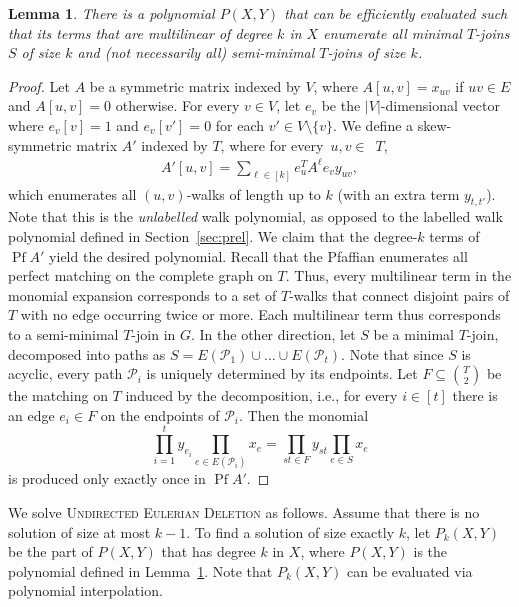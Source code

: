\documentclass[10pt,a4paper]{article}
\newtheorem{lemma}{Lemma}[section]
\newcommand{\cP}{\ensuremath{\mathcal P}\xspace}
\DeclareMathOperator{\Pf}{Pf}
\begin{document}
\begin{lemma} \label{lemma:undirected-eulerian}
  There is a polynomial $P(X,Y)$ that can be efficiently evaluated such that its terms that are multilinear of degree $k$ in $X$  enumerate all minimal $T$-joins $S$ of size $k$ and (not necessarily all) semi-minimal $T$-joins of size $k$. 
\end{lemma}
\begin{proof}
  Let $A$ be a symmetric matrix indexed by $V$, where $A[u, v] = x_{uv}$ if $uv \in E$ and $A[u, v] = 0$ otherwise.
  For every $v \in V$, let $e_v$ be the $|V|$-dimensional vector where $e_v[v] = 1$ and $e_v[v']= 0$ for each $v' \in V \setminus \{ v \}$.
  We define a skew-symmetric matrix $A'$ indexed by $T$, where for every~$u, v \in$~$T$,
  \begin{align*}
    A'[u, v] = \sum_{\ell \in [k]} e_u^T A^{\ell} e_v y_{uv},
  \end{align*}
  which enumerates all $(u,v)$-walks of length up to $k$ (with an extra term $y_{t,t'}$).
  Note that this is the \emph{unlabelled} walk polynomial, as opposed to the labelled walk polynomial defined in Section~\ref{sec:prel}.
  We claim that the degree-$k$ terms of $\Pf A'$ yield the desired polynomial.
  Recall that the Pfaffian enumerates all perfect matching on the complete graph on $T$.
  Thus, every multilinear term in the monomial expansion corresponds to a set of $T$-walks that connect disjoint pairs of $T$ with no edge occurring twice or more.
  Each multilinear term thus corresponds to a semi-minimal $T$-join in $G$.
  In the other direction, let $S$ be a minimal $T$-join, decomposed into paths as $S=E(\cP_1) \cup \ldots \cup E(\cP_t)$.
  Note that since $S$ is acyclic, every path $\cP_i$ is uniquely determined by its endpoints. 
  Let $F \subseteq \binom{T}{2}$ be the matching on $T$ induced by the decomposition,
  i.e., for every $i \in [t]$ there is an edge $e_i \in F$ on the endpoints of $\cP_i$.
  Then the monomial
  \[
    \prod_{i=1}^t y_{e_i} \prod_{e \in E(\cP_i)} x_e = \prod_{st \in F} y_{st} \prod_{e \in S} x_e
  \]
  is produced only exactly once in $\Pf A'$. 
\end{proof}

We solve \textsc{Undirected Eulerian Deletion} as follows.
Assume that there is no solution of size at most $k - 1$.
To find a solution of size exactly $k$, let $P_k(X,Y)$ be the part of $P(X,Y)$ that has degree $k$ in $X$, 
where $P(X,Y)$ is the polynomial defined in Lemma~\ref{lemma:undirected-eulerian}.
Note that $P_k(X,Y)$ can be evaluated via polynomial interpolation. 
\end{document}
